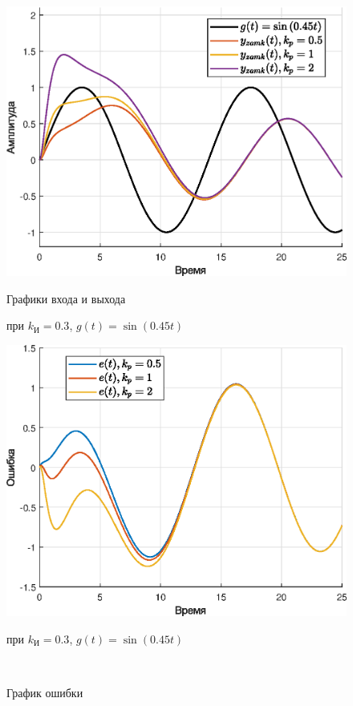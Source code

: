 \documentclass[a4paper]{article}
\begin{document}
\begin{figure}[H]
    \begin{minipage}{0.5\textwidth}
        \centering \includegraphics[width=\textwidth]{ex5/ki_0.3_g_asinwt.eps}
        \caption{Графики входа и выхода}
        \centerline{при $k_{\text{И}} = 0.3$, $g(t) = \sin{(0.45t)}$}
    \end{minipage}\hfill
    \begin{minipage}{0.5\textwidth}
        \centering \includegraphics[width=\textwidth]{ex5/ki_0.3_g_asinwt_error.eps}
        \caption{График ошибки}
        \centerline{при $k_{\text{И}} = 0.3$, $g(t) = \sin{(0.45t)}$}
    \end{minipage}\\[1em]
\end{figure}\noindent\
\end{document}
